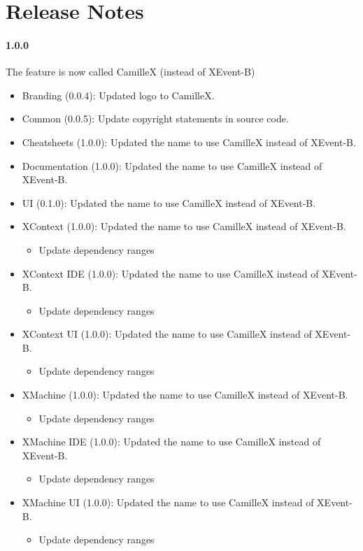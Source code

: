\appendix
\section{Release Notes}
\label{sec:release-notes}
\paragraph{1.0.0} The feature is now called CamilleX (instead of XEvent-B)
\begin{itemize}
\item Branding (0.0.4): Updated logo to CamilleX.
\item Common (0.0.5): Update copyright statements in source code.
\item Cheatsheets (1.0.0): Updated the name to use CamilleX instead of XEvent-B.
\item Documentation (1.0.0): Updated the name to use CamilleX instead of XEvent-B.
\item UI (0.1.0): Updated the name to use CamilleX instead of XEvent-B.
\item XContext (1.0.0): Updated the name to use CamilleX instead of XEvent-B.
  \begin{itemize}
  \item Update dependency ranges
  \end{itemize}
\item XContext IDE (1.0.0): Updated the name to use CamilleX instead of XEvent-B.
  \begin{itemize}
  \item Update dependency ranges
  \end{itemize}
\item XContext UI (1.0.0): Updated the name to use CamilleX instead of XEvent-B.
  \begin{itemize}
  \item Update dependency ranges
  \end{itemize}
\item XMachine (1.0.0): Updated the name to use CamilleX instead of XEvent-B.
  \begin{itemize}
  \item Update dependency ranges
  \end{itemize}
\item XMachine IDE (1.0.0): Updated the name to use CamilleX instead of XEvent-B.
  \begin{itemize}
  \item Update dependency ranges
  \end{itemize}
\item XMachine UI (1.0.0): Updated the name to use CamilleX instead of XEvent-B.
  \begin{itemize}
  \item Update dependency ranges
  \end{itemize}
\end{itemize}

